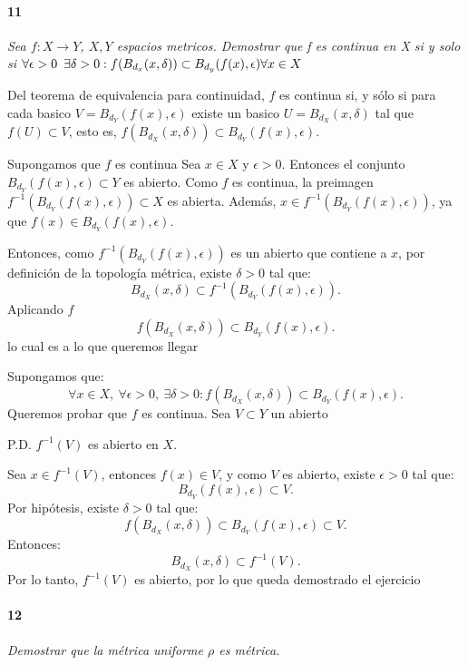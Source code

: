 \documentclass[12pt]{article}
\begin{document}
\paragraph{11}
\textit{Sea $f:X \to Y$, $X,Y$ espacios metricos. Demostrar que f es continua en X si y solo si $\forall\epsilon>0\hspace{5px}\exists\delta>0 : f(B_{d_x}(x,\delta))\subset B_{d_y}(f(x),\epsilon) \forall x\in X$}

Del teorema de equivalencia para continuidad, $f$ es continua si, y sólo si para cada basico $V=B_{d_Y}(f(x),\epsilon)$ existe un basico $U=B_{d_X}(x,\delta)$ tal que $f(U) \subset V$, esto es, $f(B_{d_X}(x,\delta)) \subset B_{d_Y}(f(x),\epsilon)$.

\vspace{1em}
Supongamos que \( f \) es continua
Sea \( x \in X \) y \( \epsilon > 0 \). Entonces el conjunto \( B_{d_Y}(f(x), \epsilon) \subset Y \) es abierto.  
Como \( f \) es continua, la preimagen \( f^{-1}(B_{d_Y}(f(x), \epsilon)) \subset X \) es abierta.  
Además, \( x \in f^{-1}(B_{d_Y}(f(x), \epsilon)) \), ya que \( f(x) \in B_{d_Y}(f(x), \epsilon) \).

Entonces, como \( f^{-1}(B_{d_Y}(f(x), \epsilon)) \) es un abierto que contiene a \( x \), por definición de la topología métrica, existe \( \delta > 0 \) tal que:
\[
B_{d_X}(x, \delta) \subset f^{-1}(B_{d_Y}(f(x), \epsilon)).
\]
Aplicando \( f \)
\[
f(B_{d_X}(x, \delta)) \subset B_{d_Y}(f(x), \epsilon).
\]
lo cual es a lo que queremos llegar

\vspace{1em}
Supongamos que:
\[
\forall x \in X,\ \forall \epsilon > 0,\ \exists \delta > 0 : f(B_{d_X}(x, \delta)) \subset B_{d_Y}(f(x), \epsilon).
\]
Queremos probar que \( f \) es continua.  
Sea \( V \subset Y \) un abierto

P.D. \( f^{-1}(V) \) es abierto en \( X \).  

Sea \( x \in f^{-1}(V) \), entonces \( f(x) \in V \), y como \( V \) es abierto, existe \( \epsilon > 0 \) tal que:
\[
B_{d_Y}(f(x), \epsilon) \subset V.
\]
Por hipótesis, existe \( \delta > 0 \) tal que:
\[
f(B_{d_X}(x, \delta)) \subset B_{d_Y}(f(x), \epsilon) \subset V.
\]
Entonces:
\[
B_{d_X}(x, \delta) \subset f^{-1}(V).
\]
Por lo tanto, \( f^{-1}(V) \) es abierto, por lo que queda demostrado el ejercicio

\paragraph{12}
\textit{Demostrar que la métrica uniforme $\rho$ es métrica.}
\end{document}
